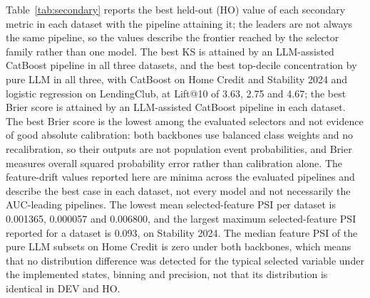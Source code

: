 \documentclass[final,5p,twocolumn]{elsarticle}
\begin{document}
Table~\ref{tab:secondary} reports the best held-out (HO) value of each secondary metric in each dataset with the pipeline attaining it; the leaders are not always the same pipeline, so the values describe the frontier reached by the selector family rather than one model. The best KS is attained by an LLM-assisted CatBoost pipeline in all three datasets, and the best top-decile concentration by pure LLM in all three, with CatBoost on Home Credit and Stability 2024 and logistic regression on LendingClub, at Lift@10 of 3.63, 2.75 and 4.67; the best Brier score is attained by an LLM-assisted CatBoost pipeline in each dataset. The best Brier score is the lowest among the evaluated selectors and not evidence of good absolute calibration: both backbones use balanced class weights and no recalibration, so their outputs are not population event probabilities, and Brier measures overall squared probability error rather than calibration alone. The feature-drift values reported here are minima across the evaluated pipelines and describe the best case in each dataset, not every model and not necessarily the AUC-leading pipelines. The lowest mean selected-feature PSI per dataset is 0.001365, 0.000057 and 0.006800, and the largest maximum selected-feature PSI reported for a dataset is 0.093, on Stability 2024. The median feature PSI of the pure LLM subsets on Home Credit is zero under both backbones, which means that no distribution difference was detected for the typical selected variable under the implemented states, binning and precision, not that its distribution is identical in DEV and HO.
\end{document}
